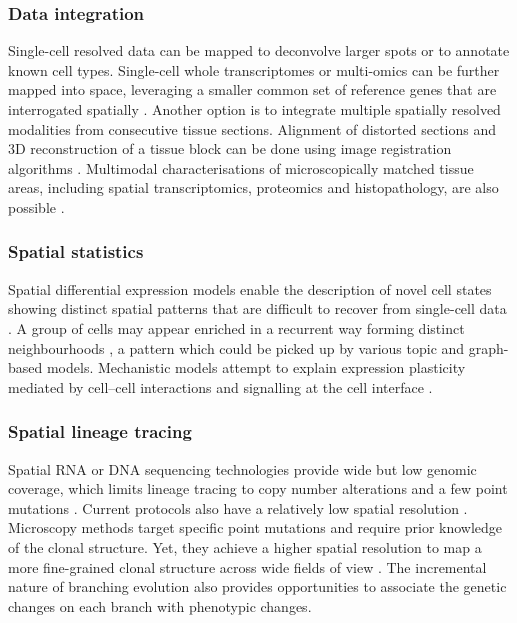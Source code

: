 {    \subsubsection*{Data integration}

    Single-cell resolved data can be mapped \parencite{Zhang2022-fv} to deconvolve larger spots or to annotate known cell types. Single-cell whole transcriptomes or multi-omics can be further mapped into space, leveraging a smaller common set of reference genes that are interrogated spatially \parencite{Zhang2022-fv, Stuart2019-mi}. Another option is to integrate multiple spatially resolved modalities from consecutive tissue sections. Alignment of distorted sections and 3D reconstruction of a tissue block can be done using image registration algorithms \parencite{Kiemen2020-dc}. Multimodal characterisations of microscopically matched tissue areas, including spatial transcriptomics, proteomics and histopathology, are also possible \parencite{Lomakin2022-ks,Velten2022-gc}.

    \subsubsection*{Spatial statistics}

    Spatial differential expression models enable the description of novel cell states showing distinct spatial patterns that are difficult to recover from single-cell data \parencite{Svensson2018-eu,Lopez2022-ar}. A group of cells may appear enriched in a recurrent way forming distinct neighbourhoods \parencite{Danenberg2022-zb,Nirmal2022-sq,McCaffrey2022-ui,Dong2022-ty}, a pattern which could be picked up by various topic and graph-based models. Mechanistic models attempt to explain expression plasticity mediated by cell–cell interactions and signalling at the cell interface \parencite{Arnol2019-fv}.

    \subsubsection*{Spatial lineage tracing}

    Spatial RNA or DNA sequencing technologies provide wide but low genomic coverage, which limits lineage tracing to copy number alterations and a few point mutations \parencite{Zhao2022-xd,Nagasawa2021-tu,Elyanow2021-tq}. Current protocols also have a relatively low spatial resolution . Microscopy methods target specific point mutations and require prior knowledge of the clonal structure. Yet, they achieve a higher spatial resolution to map a more fine-grained clonal structure across wide fields of view \parencite{Lomakin2022-ks}. The incremental nature of branching evolution also provides opportunities to associate the genetic changes on each branch with phenotypic changes.
}
    

